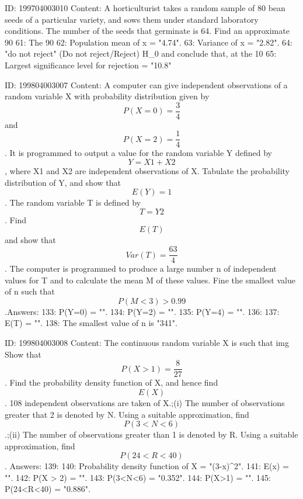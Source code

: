 \documentclass{article}
\begin{document}
ID: 199704003010
Content:
A horticulturist takes a random sample of 80 bean seeds of a particular variety, and sows them under standard laboratory conditions. The number of the seeds that germinate is 64. Find an approximate 90%
61: The 90%
62: Population mean of x = "4.74".
63: Variance of x = "2.82".
64: "do not reject" (Do not reject/Reject) H_0 and conclude that, at the 10%
65: Largest significance level for rejection = "10.8"%

ID: 199804003007
Content:
A computer can give independent observations of a random variable X with probability distribution given by $$P(X=0) = \frac{3}{4}$$ and $$P(X=2) = \frac{1}{4}$$. It is programmed to output a value for the random variable Y defined by $$Y = X1+X2$$, where X1 and X2 are independent observations of X. Tabulate the probability distribution of Y, and show that $$E(Y) = 1$$.  The random variable T is defined by $$T = Y2$$. Find $$E(T)$$ and show that $$Var(T) = \frac{63}{4}$$.  The computer is programmed to produce a large number n of independent values for T and to calculate the mean M of these values. Fine the smallest value of n such that $$P(M < 3) > 0.99$$.Answers:
133: P(Y=0) = "".
134: P(Y=2) = "".
135: P(Y=4) = "".
136: 
137: E(T) = "".
138: The smallest value of n is "341".

ID: 199804003008
Content:
The continuous random variable X is such that img Show that $$P(X > 1) = \frac{8}{27}$$.  Find the probability density function of X, and hence find $$E(X)$$.  108 independent observations are taken of X.;(i) The number of observations greater that 2 is denoted by N. Using a suitable approximation, find $$P(3 < N < 6)$$.;(ii) The number of observations greater than 1 is denoted by R. Using a suitable approximation, find $$P(24 < R < 40)$$. Answers:
139: 
140: Probability density function of X = "(3-x)^2".
141: E(x) = "".
142: P(X > 2) = "".
143: P(3<N<6) = "0.352".
144: P(X>1) = "".
145: P(24<R<40) = "0.886".
\end{document}
